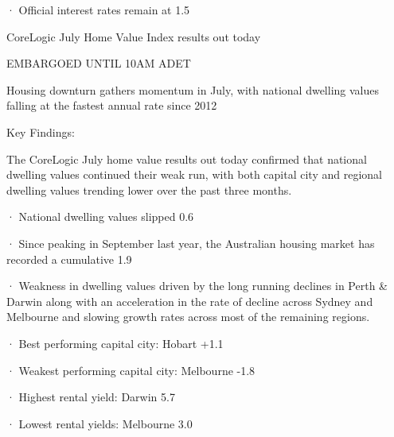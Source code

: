 ·       Official interest rates remain at 1.5%




CoreLogic July Home Value Index results out today

 

EMBARGOED UNTIL 10AM ADET

 

Housing downturn gathers momentum in July, with national dwelling values falling at the fastest annual rate since 2012

 

Key Findings:

 

The CoreLogic July home value results out today confirmed that national dwelling values continued their weak run, with both capital city and regional dwelling values trending lower over the past three months.

 

·         National dwelling values slipped 0.6%

·         Since peaking in September last year, the Australian housing market has recorded a cumulative 1.9%

·         Weakness in dwelling values driven by the long running declines in Perth & Darwin along with an acceleration in the rate of decline across Sydney and Melbourne and slowing growth rates across most of the remaining regions.

·         Best performing capital city: Hobart +1.1%

·         Weakest performing capital city: Melbourne -1.8%

·         Highest rental yield: Darwin 5.7%

·         Lowest rental yields: Melbourne 3.0%




\iffalse Should they invest at the high level now and push the prices upwards for other market participants or risk paying a higher price later themselves if other market participants start buying.\fi
